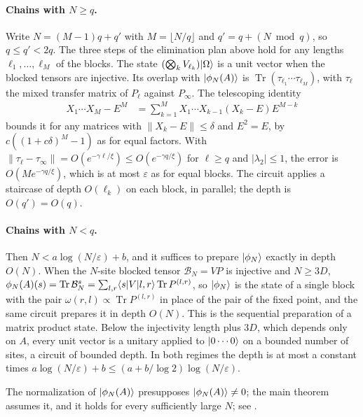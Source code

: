 \documentclass{article}
\begin{document}
\paragraph{Chains with $N\ge q$.} Write $N=(M-1)q+q'$ with $M=\lfloor N/q\rfloor$
and $q'=q+(N\bmod q)$, so $q\le q'<2q$. The three steps of the elimination
plan above hold for any lengths $\ell_1,\dots,\ell_M$ of the blocks. The
state $(\bigotimes_kV_{\ell_k})|\Omega\rangle$ is a unit vector when the blocked
tensors are injective. Its overlap with $|\phi_N(A)\rangle$ is
$\operatorname{Tr}(\tau_{\ell_1}\cdots\tau_{\ell_M})$, with $\tau_\ell$ the mixed transfer
matrix of $P_\ell$ against $P_\infty$. The telescoping identity
\begin{align}
    X_1\cdots X_M-E^M
     & =\sum_{k=1}^{M}X_1\cdots X_{k-1}(X_k-E)E^{M-k}
    \label{eq:mswc24_depth_telescoping_product}
\end{align}
bounds it for any matrices with $\lVert X_k-E\rVert\le\delta$ and $E^2=E$, by
$c((1+c\delta)^M-1)$ as for equal factors. With $\lVert\tau_\ell-\tau_\infty\rVert
=O(e^{-\gamma\ell/\xi})\le O(e^{-\gamma q/\xi})$ for $\ell\ge q$ and
$\lvert\lambda_2\rvert\le1$, the error is $O(Me^{-\gamma q/\xi})$, which is at
most $\varepsilon$ as for equal blocks. The circuit applies a staircase of depth
$O(\ell_k)$ on each block, in parallel; the depth is $O(q')=O(q)$.

\paragraph{Chains with $N<q$.} Then $N<a\log(N/\varepsilon)+b$, and it suffices
to prepare $|\phi_N\rangle$ exactly in depth $O(N)$. When the $N$-site blocked
tensor $\mathcal B_N=VP$ is injective and $N\ge3D$,
$\phi_N(A)(s)=\operatorname{Tr}\mathcal B_N^s=\sum_{l,r}\langle s|V|l,r\rangle\operatorname{Tr} P^{(l,r)}$, so
$|\phi_N\rangle$ is the state of a single block with the pair
$\omega(r,l)\propto\operatorname{Tr} P^{(l,r)}$ in place of the pair of the fixed point, and
the same circuit prepares it in depth $O(N)$. This is the sequential
preparation of a matrix product state. Below the injectivity length plus $3D$,
which depends only on $A$, every unit vector is a unitary applied to
$|0\cdots0\rangle$ on a bounded number of sites, a circuit of bounded depth.
In both regimes the depth is at most a constant times
$a\log(N/\varepsilon)+b\le(a+b/\log2)\log(N/\varepsilon)$.

The normalization of $|\phi_N(A)\rangle$ presupposes $|\phi_N(A)\rangle\neq0$; the
main theorem assumes it, and it holds for every sufficiently large $N$; see
.



\end{document}
